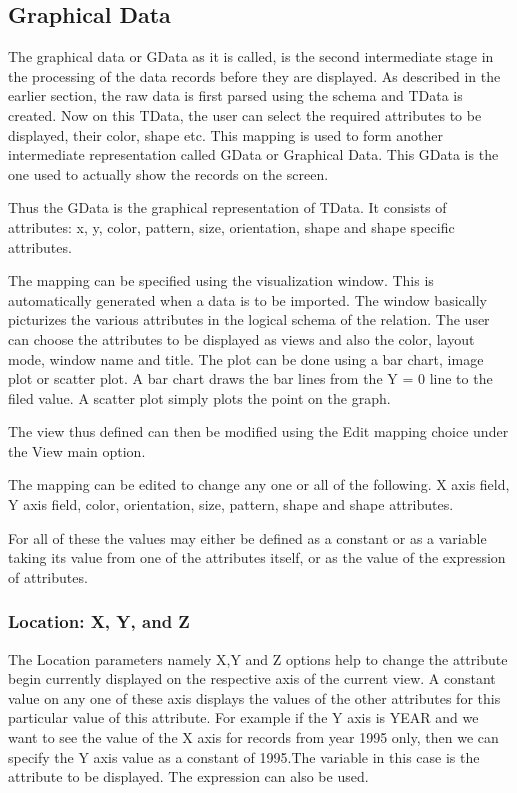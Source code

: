 \subsection{Graphical Data}

The graphical data or GData as it is called, is the second
intermediate stage in the processing of the data records before they
are displayed. As described in the earlier section, the raw data is
first parsed using the schema and TData is created. Now on this TData,
the user can select the required attributes to be displayed, their
color, shape etc. This mapping is used to form another intermediate
representation called GData or Graphical Data. This GData is the one
used to actually show the records on the screen.

Thus the GData is the graphical representation of TData. It consists
of attributes: x, y, color, pattern, size, orientation, shape and
shape specific attributes.

The mapping can be specified using the visualization window. This is
automatically generated when a data is to be imported. The window
basically picturizes the various attributes in the logical schema of
the relation. The user can choose the attributes to be displayed as
views and also the color, layout mode, window name and title. The plot
can be done using a bar chart, image plot or scatter plot. A bar
chart draws the bar lines from the Y = 0 line to the filed value. A
scatter plot simply plots the point on the graph.

The view thus defined can then be modified using the Edit mapping
choice under the View main option.

The mapping can be edited to change any one or all of the following.
X axis field, Y axis field, color, orientation, size, pattern, shape
and shape attributes.

For all of these the values may either be defined as a constant or as
a variable taking its value from one of the attributes itself, or as
the value of the expression of attributes.

\subsubsection{Location: X, Y, and Z}

The Location parameters namely X,Y and Z options help to change the
attribute begin currently displayed on the respective axis of the
current view. A constant value on any one of these axis displays the
values of the other attributes for this particular value of this
attribute. For example if the Y axis is YEAR and we want to see the
value of the X axis for records from year 1995 only, then we can
specify the Y axis value as a constant of 1995.The variable in this
case is the attribute to be displayed. The expression can also be
used.

